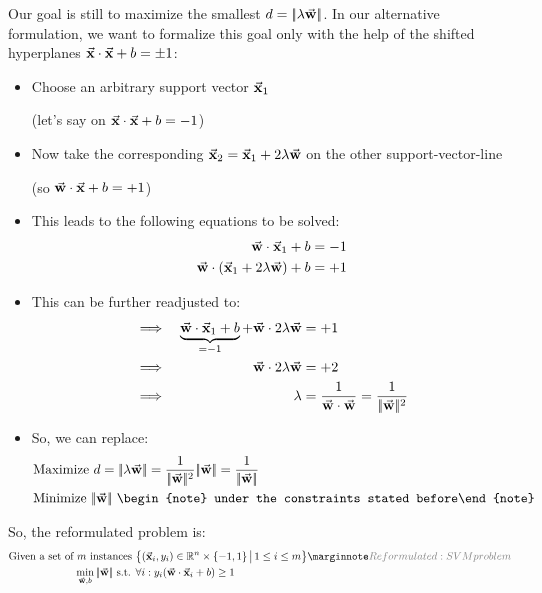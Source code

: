 Our goal is still to maximize the smallest $d=|\!| \lambda \vec{\mathbf{w}} |\!|$. In our alternative formulation, we want to formalize this goal only with the help of the shifted hyperplanes $\vec{\mathbf{x}}\cdot\vec{\mathbf{x}} + b = \pm1$:
\begin{itemize}
  \item Choose an arbitrary support vector $\vec{\mathbf{x}}_1$ \begin{note}(let's say on $\vec{\mathbf{x}}\cdot\vec{\mathbf{x}} + b = -1$)\end{note}
  \item Now take the corresponding $\vec{\mathbf{x}}_2 = \vec{\mathbf{x}}_1 + 2\lambda\vec{\mathbf{w}}$ on the other support-vector-line \begin{note}(so $\vec{\mathbf{w}}\cdot\vec{\mathbf{x}} + b = +1$)\end{note}
  \item This leads to the following equations to be solved:
  \begin{align*}\begin{aligned}
    \vec{\mathbf{w}}\cdot\vec{\mathbf{x}}_1 + b &= -1 \\
    \vec{\mathbf{w}}\cdot(\vec{\mathbf{x}}_1 + 2\lambda\vec{\mathbf{w}}) + b &= +1
  \end{aligned}\end{align*}
  \item This can be further readjusted to:
  \begin{align*}\begin{aligned}
    \implies && \underbrace{\vec{\mathbf{w}}\cdot\vec{\mathbf{x}}_1 + b}_{=-1} + \vec{\mathbf{w}}\cdot2\lambda\vec{\mathbf{w}} &= +1\\
    \implies && \vec{\mathbf{w}}\cdot2\lambda\vec{\mathbf{w}} &= +2\\
    \implies && \lambda &= \frac{1}{\vec{\mathbf{w}}\cdot\vec{\mathbf{w}}} = \frac{1}{|\!| \vec{\mathbf{w}} |\!|^2}
  \end{aligned}\end{align*}
  \item So, we can replace:
  \begin{align*}
    &\text{Maximize } d=\norm{\lambda \cv{w}} = \frac{1}{\norm{\cv{w}}^2}\norm{\cv{w}} = \frac{1}{\norm{\cv{w}}}\\
    &\text{Minimize } \norm{\cv{w}} \text{ \begin{note} under the constraints stated before\end{note}}
  \end{align*}
\end{itemize}

So, the reformulated problem is:
\begin{align*}\begin{aligned}
  \text{Given a set of } m \text{ instances }& \big\{ (\cv{x}_i, y_i) \in \mathbb{R}^n\times\{-1,1\} \,\big|\, 1\leq i\leq m \big\}\sidenote{Reformulated: SVM problem}\\
  \min_{\cv{w}, b}\norm{\cv{w}} \text{ s.t. }& \forall i: y_i(\cv{w}\cdot\cv{x}_i + b) \geq 1
\end{aligned}\end{align*}

